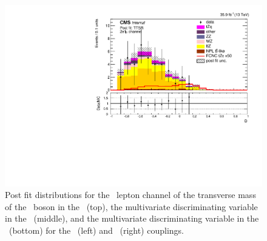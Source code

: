\begin{figure}[htbp]
	\includegraphics[width=0.49\linewidth]{6_Search/Figures/ZctFit/shapes_fit_s_LepChan_2e1mu_TTSR_error_trial.pdf}
	\caption{Post fit distributions for the \eemu\ lepton channel of the transverse mass of the \PW\ boson in the \WZCR\ (top), the multivariate discriminating variable in the \STSR\ (middle), and the multivariate discriminating variable in the \TTSR\ (bottom) for the \Zut\ (left) and \Zct\ (right) couplings. }
	\label{fig:shapesfit2e1mu}
\end{figure}

